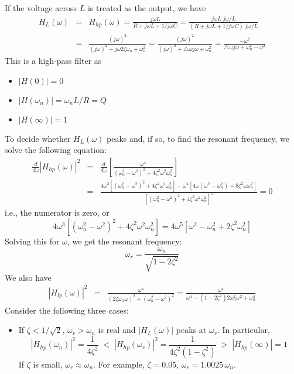 \documentclass{article}
\begin{document}
\begin{itemize}
  If the voltage across $L$ is treated as the output, we have
  \begin{eqnarray}
  H_L(\omega)&=&H_{hp}(\omega)=\frac{j\omega L}{R+j\omega L+1/j\omega C}
  =\frac{j\omega L\;j\omega/L}{(R+j\omega L+1/j\omega C)\;j\omega/L}
  \nonumber\\
  &=&\frac{(j\omega)^2}{(j\omega)^2+j\omega 2\zeta \omega_n+\omega_n^2}
  =\frac{(j\omega)^2}{(j\omega)^2+\triangle \omega j\omega +\omega_n^2}
  =\frac{-\omega^2}{\triangle \omega j\omega +\omega_n^2-\omega^2}
  \end{eqnarray}
  This is a high-pass filter as
  \begin{itemize}
  \item $|H(0)|=0$
  \item $|H(\omega_n)|=\omega_nL/R=Q$
  \item $|H(\infty)|=1$
  \end{itemize}
  To decide whether $H_L(\omega)$ peaks and, if so, to find the resonant
  frequency, we solve the following equation:
  \begin{eqnarray}
    \frac{d}{d\omega}|H_{hp}(\omega)|^2
    &=&\frac{d}{d\omega}\left[\frac{\omega^4}{(\omega_n^2-\omega^2)^2
        +4\zeta^2\omega^2\omega_n^2}\right]
    \nonumber\\
    &=&\frac{4\omega^3[(\omega_n^2-\omega^2)^2+4\zeta^2\omega^2\omega_n^2]
      -\omega^4[4\omega(\omega^2-\omega^2_n)+8\zeta^2\omega\omega_n^2]}{[(\omega_n^2-\omega^2)^2+4\zeta^2\omega^2\omega_n^2]^2}  =0
  \end{eqnarray}
  i.e., the numerator is zero, or
  \begin{equation}
    4\omega^3[(\omega_n^2-\omega^2)^2+4\zeta^2\omega^2\omega_n^2]
    =4\omega^5[\omega^2-\omega^2_n+2\zeta^2\omega_n^2]
  \end{equation}
  Solving this for $\omega$, we get the resonant frequency:
  \begin{equation}
    \omega_r=\frac{\omega_n}{\sqrt{1-2\zeta^2}}
  \end{equation}
  We also have
  \begin{eqnarray}
    |H_{lp}(\omega)|^2&=&\frac{\omega^4}{(2\zeta\omega_n\omega)^2+(\omega_n^2-\omega^2)^2}
    =\frac{\omega^4}{\omega^4-(1-2\zeta^2)2\omega_n^2\omega^2+\omega_n^4}
  \end{eqnarray}
  Consider the following three cases:
  \begin{itemize}
  \item If $\zeta<1/\sqrt{2}$, $\omega_r>\omega_n$ is real and 
    $|H_L(\omega)|$ peaks at $\omega_r$. In particular,
    \begin{equation}
      |H_{hp}(\omega_n)|^2=\frac{1}{4\zeta^2}\;<\;
      |H_{hp}(\omega_r)|^2=\frac{1}{4\zeta^2(1-\zeta^2)}
      \;>\; |H_{hp}(\infty)|=1
    \end{equation}
    If $\zeta$ is small, $\omega_r\approx\omega_n$. For example,
    $\zeta=0.05$, $\omega_r=1.0025\,\omega_n$. 


\end{itemize}
\end{itemize}
\end{document}
